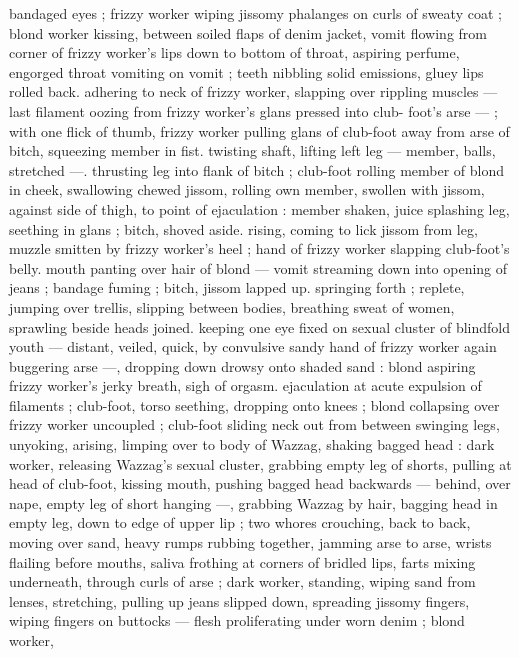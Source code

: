 {bandaged eyes ; frizzy worker wiping jissomy phalanges on curls of 
sweaty coat ; blond worker kissing, between soiled flaps of denim 
jacket, vomit flowing from corner of frizzy worker's lips down to 
bottom of throat, aspiring perfume, engorged throat vomiting on 
vomit ; teeth nibbling solid emissions, gluey lips rolled back. 
adhering to neck of frizzy worker, slapping over rippling muscles --- 
last filament oozing from frizzy worker's glans pressed into club- 
foot's arse --- ; with one flick of thumb, frizzy worker pulling glans 
of club-foot away from arse of bitch, squeezing member in fist. 
twisting shaft, lifting left leg --- member, balls, stretched ---. 
thrusting leg into flank of bitch ; club-foot rolling member of blond 
in cheek, swallowing chewed jissom, rolling own member, swollen 
with jissom, against side of thigh, to point of ejaculation : member 
shaken, juice splashing leg, seething in glans ; bitch, shoved aside. 
rising, coming to lick jissom from leg, muzzle smitten by frizzy 
worker's heel ; hand of frizzy worker slapping club-foot's belly. 
mouth panting over hair of blond --- vomit streaming down into 
opening of jeans ; bandage fuming ; bitch, jissom lapped up. 
springing forth ; replete, jumping over trellis, slipping between 
bodies, breathing sweat of women, sprawling beside heads joined. 
keeping one eye fixed on sexual cluster of blindfold youth --- 
distant, veiled, quick, by convulsive sandy hand of frizzy worker 
again buggering arse ---, dropping down drowsy onto shaded sand : 
blond aspiring frizzy worker's jerky breath, sigh of orgasm. 
ejaculation at acute expulsion of filaments ; club-foot, torso 
seething, dropping onto knees ; blond collapsing over frizzy worker 
uncoupled ; club-foot sliding neck out from between swinging legs, 
unyoking, arising, limping over to body of Wazzag, shaking bagged 
head : dark worker, releasing Wazzag's sexual cluster, grabbing 
empty leg of shorts, pulling at head of club-foot, kissing mouth, 
pushing bagged head backwards --- behind, over nape, empty leg of 
short hanging ---, grabbing Wazzag by hair, bagging head in empty 
leg, down to edge of upper lip ; two whores crouching, back to back, 
moving over sand, heavy rumps rubbing together, jamming arse to 
arse, wrists flailing before mouths, saliva frothing at corners of 
bridled lips, farts mixing underneath, through curls of arse ; dark 
worker, standing, wiping sand from lenses, stretching, pulling up 
jeans slipped down, spreading jissomy fingers, wiping fingers on 
buttocks --- flesh proliferating under worn denim ; blond worker, 
}

